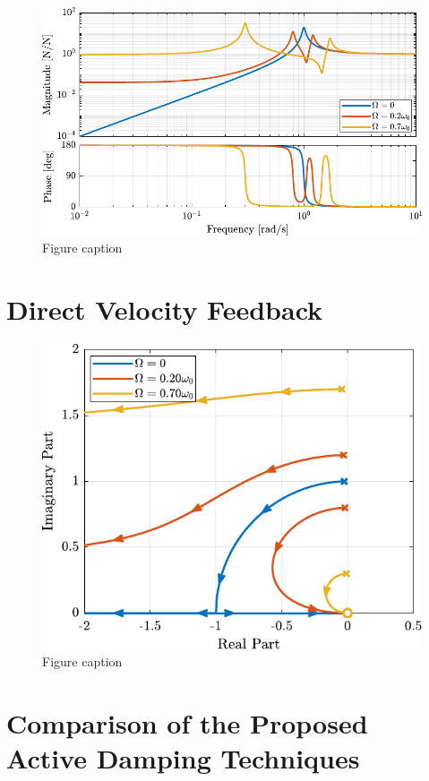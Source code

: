 \documentclass{ISMA_USD2020}
\begin{document}
\begin{figure}[htbp]
\centering
\includegraphics[scale=1]{figs/plant_iff_compare_rotating_speed.pdf}
\caption{\label{fig:plant_iff_compare_rotating_speed}Figure caption}
\end{figure}

\section{Direct Velocity Feedback}
\label{sec:org027d051}

\begin{figure}[htbp]
\centering
\includegraphics[scale=1]{figs/root_locus_dvf.pdf}
\caption{\label{fig:root_locus_dvf}Figure caption}
\end{figure}

\section{Comparison of the Proposed Active Damping Techniques}
\label{sec:org1eaa959}
\end{document}
